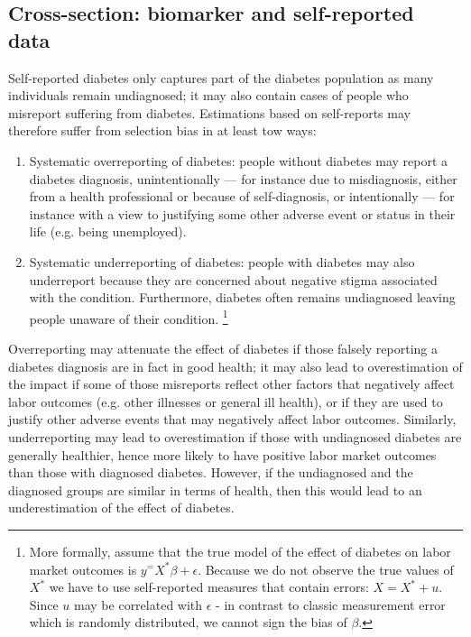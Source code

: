 \documentclass[12pt,english]{article}
\begin{document}
\subsection{\label{sec:Biomarker Strategy}Cross-section: biomarker and self-reported data}

Self-reported diabetes only captures part of the diabetes population as many individuals remain undiagnosed; it may also contain cases of people who misreport suffering from diabetes.  Estimations based on self-reports may therefore suffer from selection bias in at least tow ways:

\begin{enumerate}
\item Systematic overreporting of diabetes: people without diabetes
may report a diabetes diagnosis, unintentionally --- for instance due to misdiagnosis, either from a health professional or because of self-diagnosis, or intentionally --- for instance with a view to justifying some other adverse event or status in their life (e.g. being unemployed). 
\item Systematic underreporting of diabetes: people with diabetes may also underreport because they are concerned about negative stigma associated with the condition. Furthermore, diabetes often remains undiagnosed leaving people unaware of their condition.
\footnote{More formally, assume that the true model of the effect of diabetes on labor market outcomes is $y^=X^{*}\beta+\epsilon$. Because we do not observe the true values of  $X^{*}$  we have to use self-reported measures that contain errors: $X=X^{*} + u$. Since $u$ may be correlated with $\epsilon$ - in contrast to classic measurement error which is randomly distributed, we cannot sign the bias of  $\beta$.} 

\end{enumerate} 

Overreporting may attenuate the effect of diabetes if those falsely reporting a diabetes diagnosis are in fact in good health; it may also lead to overestimation of the impact if some of those misreports reflect other factors that negatively affect labor outcomes (e.g. other illnesses or general ill health), or if they are used to justify other adverse events that may negatively affect labor outcomes. Similarly, underreporting may lead to overestimation if those with undiagnosed diabetes are generally healthier, hence more likely to have positive labor market outcomes than those with diagnosed diabetes. However, if the undiagnosed and the diagnosed groups are similar in terms of health, then this would lead to an underestimation of the effect of diabetes. 
\end{document}
